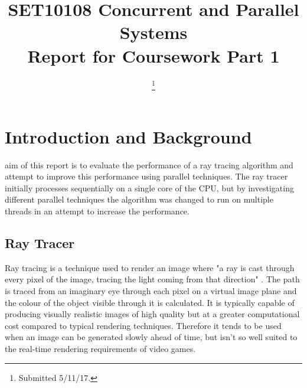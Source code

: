 \documentclass[journal,transmag]{IEEEtran}
\begin{document}
	
	\title{SET10108 Concurrent and Parallel Systems\\Report for Coursework Part 1}
	
	\author{
		
		\thanks{Submitted 5/11/17.}}
	
	
	
	
	\maketitle
	
	\IEEEdisplaynontitleabstractindextext
	
	\IEEEpeerreviewmaketitle
	
	\section{Introduction and Background}
	
	 aim of this report is to evaluate the performance of a ray tracing algorithm and attempt to improve this performance using parallel techniques. The ray tracer initially processes sequentially on a single core of the CPU, but by investigating different parallel techniques the algorithm was changed to run on multiple threads in an attempt to increase the performance.
	
	\subsection{Ray Tracer}
	Ray tracing is a technique used to render an image where "a ray is cast through every pixel of the image, tracing the light coming from that direction" \cite{ray}. The path is traced from an imaginary eye through each pixel on a virtual image plane and the colour of the object visible through it is calculated. It is typically capable of producing visually realistic images of high quality but at a greater computational cost compared to typical rendering techniques. Therefore it tends to be used when an image can be generated slowly ahead of time, but isn't so well suited to the real-time rendering requirements of video games.
	
\end{document}
